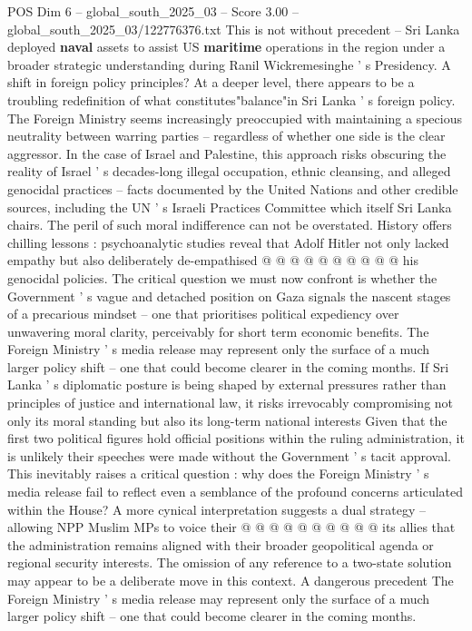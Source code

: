 \begin{textsample}{POS Dim 6 – global\_south\_2025\_03 – Score 3.00 – global\_south\_2025\_03/122776376.txt}
This is not without precedent -- Sri Lanka deployed \textbf{naval} assets to assist US \textbf{maritime} operations in the region under a broader strategic understanding during Ranil Wickremesinghe ' s Presidency.
A shift in foreign policy principles?
At a deeper level, there appears to be a troubling redefinition of what constitutes"balance"in Sri Lanka ' s foreign policy.
The Foreign Ministry seems increasingly preoccupied with maintaining a specious neutrality between warring parties -- regardless of whether one side is the clear aggressor.
In the case of Israel and Palestine, this approach risks obscuring the reality of Israel ' s decades-long illegal occupation, ethnic cleansing, and alleged genocidal practices -- facts documented by the United Nations and other credible sources, including the UN ' s Israeli Practices Committee which itself Sri Lanka chairs.
The peril of such moral indifference can not be overstated.
History offers chilling lessons : psychoanalytic studies reveal that Adolf Hitler not only lacked empathy but also deliberately de-empathised @ @ @ @ @ @ @ @ @ @ his genocidal policies.
The critical question we must now confront is whether the Government ' s vague and detached position on Gaza signals the nascent stages of a precarious mindset -- one that prioritises political expediency over unwavering moral clarity, perceivably for short term economic benefits.
The Foreign Ministry ' s media release may represent only the surface of a much larger policy shift -- one that could become clearer in the coming months.
If Sri Lanka ' s diplomatic posture is being shaped by external pressures rather than principles of justice and international law, it risks irrevocably compromising not only its moral standing but also its long-term national interests Given that the first two political figures hold official positions within the ruling administration, it is unlikely their speeches were made without the Government ' s tacit approval.
This inevitably raises a critical question : why does the Foreign Ministry ' s media release fail to reflect even a semblance of the profound concerns articulated within the House?
A more cynical interpretation suggests a dual strategy -- allowing NPP Muslim MPs to voice their @ @ @ @ @ @ @ @ @ @ its allies that the administration remains aligned with their broader geopolitical agenda or regional security interests.
The omission of any reference to a two-state solution may appear to be a deliberate move in this context.
A dangerous precedent The Foreign Ministry ' s media release may represent only the surface of a much larger policy shift -- one that could become clearer in the coming months.

\end{textsample}
